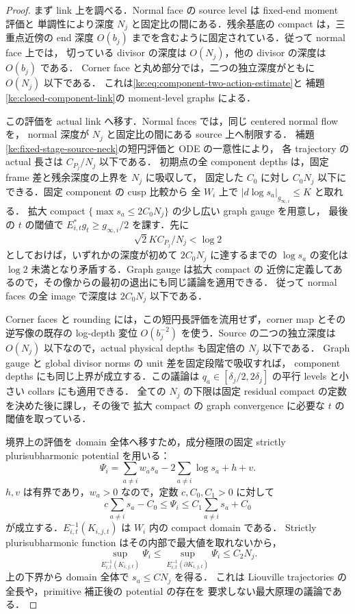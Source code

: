 \begin{proof}
まず link 上を調べる．Normal face の source level は fixed-end moment 評価と
単調性により深度 $N_j$ と固定比の間にある．残余基底の compact は，三重点近傍の
end 深度 $O(b_j)$ までを含むように固定されている．従って normal face 上では，
切っている divisor の深度は $O(N_j)$，他の divisor の深度は $O(b_j)$ である．
Corner face と丸め部分では，二つの独立深度がともに $O(N_j)$ 以下である．
これは\eqref{ke:eq:component-two-action-estimate}と
補題\ref{ke:closed-component-link}の moment-level graphs による．

この評価を actual link へ移す．Normal faces では，同じ centered normal flow を，
normal 深度が $N_j$ と固定比の間にある source 上へ制限する．
補題\ref{ke:fixed-stage-source-neck}の短円評価と ODE の一意性により，
各 trajectory の actual 長さは $C_{P_j}/N_j$ 以下である．
初期点の全 component depths は，固定 frame 差と残余深度の上界を $N_j$ に吸収して，
固定した $C_0$ に対し $C_0N_j$ 以下にできる．固定 component の cusp 比較から
全 $W_i$ 上で $|d\log s_a|_{g_{\infty,i}}\le K$ と取れる．
拡大 compact $\{\max s_a\le2C_0N_j\}$ の少し広い graph gauge を用意し，
最後の $t$ の閾値で $E_{i,t}^*g_t\ge g_{\infty,i}/2$ を課す．先に
\[
 \sqrt2 K C_{P_j}/N_j<\log2
\]
としておけば，いずれかの深度が初めて $2C_0N_j$ に達するまでの
$\log s_a$ の変化は $\log2$ 未満となり矛盾する．Graph gauge は拡大 compact の
近傍に定義してあるので，その像からの最初の退出にも同じ議論を適用できる．
従って normal faces の全 image で深度は $2C_0N_j$ 以下である．

Corner faces と rounding には，この短円長評価を流用せず，corner map とその
逆写像の既存の log-depth 変位 $O(b_j^{-2})$ を使う．Source の二つの独立深度は
$O(N_j)$ 以下なので，actual physical depths も固定倍の $N_j$ 以下である．
Graph gauge と global divisor norms の unit 差を固定段階で吸収すれば，
component depths にも同じ上界が成立する．この議論は
$q_a\in[\delta_j/2,2\delta_j]$ の平行 levels と小さい collars にも適用できる．
全ての $N_j$ の下限は固定 residual compact の定数を決めた後に課し，その後で
拡大 compact の graph convergence に必要な $t$ の閾値を取っている．

境界上の評価を domain 全体へ移すため，成分極限の固定 strictly plurisubharmonic
potential を用いる：
\[
 \Psi_i=\sum_{a\ne i}w_as_a-2\sum_{a\ne i}\log s_a+h+v .
\]
$h,v$ は有界であり，$w_a>0$ なので，定数 $c,C_0,C_1>0$ に対して
\[
 c\sum_{a\ne i}s_a-C_0\le\Psi_i
 \le C_1\sum_{a\ne i}s_a+C_0
\]
が成立する．$E_{i,t}^{-1}(K_{i,j,t})$ は $W_i$ 内の compact domain である．
Strictly plurisubharmonic function はその内部で最大値を取れないから，
\[
 \sup_{E_{i,t}^{-1}(K_{i,j,t})}\Psi_i
 \le\sup_{E_{i,t}^{-1}(\partial K_{i,j,t})}\Psi_i
 \le C_2N_j .
\]
上の下界から domain 全体で $s_a\le C N_j$ を得る．
これは Liouville trajectories の全長や，primitive 補正後の potential の存在を
要求しない最大原理の議論である．


\end{proof}
